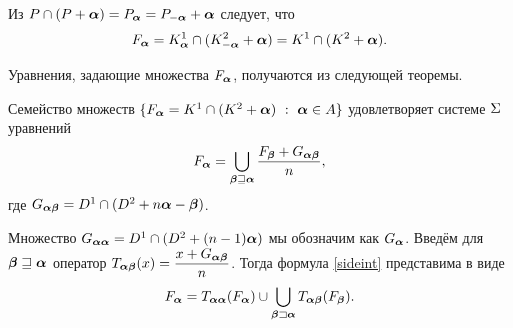 Из $P\cap (P+{\bm{\alpha}})=P_{\bm{\alpha}}=P_{-{\bm{\alpha}}}+{\bm{\alpha}}$ следует, что 
\begin{equation}\label{eq:fbma}
F_{{\bm{\alpha}}}=K^1_{\bm{\alpha}}\cap(K^2_{-{\bm{\alpha}}}+{\bm{\alpha}})=K^1\cap(K^2+{\bm{\alpha}}).
\end{equation}


Уравнения, задающие множества $F_{\bm{\alpha}}$, получаются из следующей теоремы.

\begin{theorem}\label{IFC}
Семейство множеств $\{F_{\bm{\alpha}}=K^1\cap(K^2+{\bm{\alpha}})\ :\ {\bm{\alpha}}\in A\}$ удовлетворяет системе $\Sigma$ уравнений 
\begin{equation}\label{sideint}
F_{\bm{\alpha}}=\bigcup\limits_{{\bm{\beta}}\sqsupseteq{\bm{\alpha}}} 
\dfrac{F_{\bm{\beta}}+G_{{\bm{\alpha}}{\bm{\beta}}}}{n},
\end{equation}
где $G_{{\bm{\alpha}}{\bm{\beta}}}=D^1\cap(D^2+n{\bm{\alpha}}-{\bm{\beta}})$.
\end{theorem}

Множество $G_{{\bm{\alpha}}{\bm{\alpha}}}=D^1\cap(D^2+(n-1){\bm{\alpha}})$ мы обозначим как $G_{{\bm{\alpha}}}$.
Введём для ${\bm{\beta}}\sqsupseteq{\bm{\alpha}}$ оператор $T_{{\bm{\alpha}}{\bm{\beta}}}(x) = \dfrac{x+G_{{\bm{\alpha}}{\bm{\beta}}}}{n}$.
Тогда формула \eqref{sideint} представима в виде 
$$F_{{\bm{\alpha}}} = T_{{\bm{\alpha}}{\bm{\alpha}}}(F_{\bm{\alpha}}) \cup \bigcup_{{\bm{\beta}}\sqsupset{\bm{\alpha}}}T_{{\bm{\alpha}}{\bm{\beta}}}(F_{\bm{\beta}}).$$

